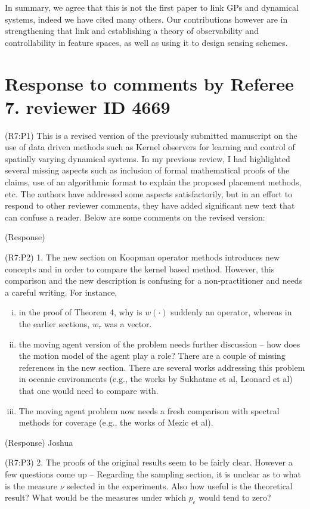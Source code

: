 \documentclass{letter}
\begin{document}
In summary, we agree that this is not the first paper to link GPs and dynamical systems, indeed we have cited many others. Our contributions however are in strengthening that link and establishing a theory of observability and controllability  in feature spaces, as well as using it to design sensing schemes.

\section{Response to comments by Referee 7. reviewer ID 4669}

{\color{red}(R7:P1)} This is a revised version of the previously submitted manuscript on the use of data driven methods such as Kernel observers for learning and
control of spatially varying dynamical systems. In my previous review, I had highlighted several missing aspects such as inclusion of formal
mathematical proofs of the claims, use of an algorithmic format to explain the proposed placement methods, etc.
The authors have addressed some aspects satisfactorily, but in an effort to respond to other reviewer comments, they have added
significant new text that can confuse a reader. Below are some comments on the revised version:

{\color{red}(Response)} 

{\color{red}(R7:P2)} 1. The new section on Koopman operator methods introduces new concepts and in order to compare the kernel based method. However, this
comparison and the new description is confusing for a non-practitioner and needs a careful writing. For instance,
\begin{enumerate}[(i)]
	\item in the proof of Theorem 4, why is $w(\cdot)$ suddenly an operator, whereas in the earlier sections, $w_\tau$ was a vector.
	\item the moving agent version of the problem needs further discussion -- how does the motion model of the agent play a role? There are a couple of missing references in the new section. There are several works	addressing this problem in oceanic environments (e.g., the works by	Sukhatme et al, Leonard et al) that one would need to compare with.
	\item The moving agent problem now needs a fresh comparison with spectral methods for coverage (e.g., the works of Mezic et al). 
\end{enumerate}

{\color{red}(Response)} Joshua


{\color{red}(R7:P3)} 2. The proofs of the original results seem to be fairly clear. However a few questions come up -- Regarding the sampling section, it is
unclear as to what is the measure $\nu$ selected in the experiments. Also how useful is the theoretical result? What would be the measures under which $p_\epsilon$ would tend to zero?  
\end{document}
